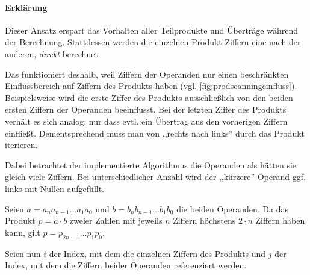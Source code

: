     \paragraph*{Erklärung}
    Dieser Ansatz erspart das Vorhalten aller Teilprodukte und Überträge während der Berechnung. Stattdessen werden die einzelnen Produkt-Ziffern eine nach der anderen, \emph{direkt} berechnet.

    Das funktioniert deshalb, weil Ziffern der Operanden nur einen beschränkten Einflussbereich auf Ziffern des Produkts haben (vgl. \autoref{fig:prodscanningeinfluss}). Beispielsweise wird die erste Ziffer des Produkts ausschließlich von den beiden ersten Ziffern der Operanden beeinflusst. Bei der letzten Ziffer des Produkts verhält es sich analog, nur dass evtl. ein Übertrag aus den vorherigen Ziffern einfließt. Dementsprechend muss man von ,,rechts nach links'' durch das Produkt iterieren.

    Dabei betrachtet der implementierte Algorithmus die Operanden als hätten sie gleich viele Ziffern. Bei unterschiedlicher Anzahl wird der ,,kürzere'' Operand ggf. links mit Nullen aufgefüllt.

    Seien $a=a_{n}a_{n-1}\dots{}a_{1}a_{0}$ und $b=b_{n}b_{n-1}\dots{}b_{1}b_{0}$ die beiden Operanden.
    Da das Produkt $p = a \cdot b$ zweier Zahlen mit jeweils $n$ Ziffern höchstens $2 \cdot n$ Ziffern haben kann, gilt $p=p_{2 n-1}\dots{}p_{1}p_{0}$.

    Seien nun $i$ der Index, mit dem die einzelnen Ziffern des Produkts
    und $j$ der Index, mit dem die Ziffern beider Operanden referenziert werden.

